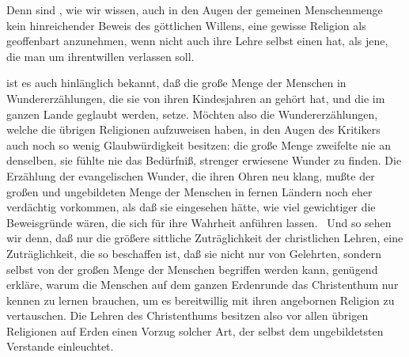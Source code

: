 \begin{aufza}
Denn  sind , wie wir wissen, auch in den Augen der gemeinen Menschenmenge kein hinreichender Beweis des göttlichen Willens, eine gewisse Religion als geoffenbart anzunehmen, wenn nicht auch ihre Lehre selbst einen  hat, als jene, die man um ihrentwillen verlassen soll.\par
{} ist es auch hinlänglich bekannt, daß die große Menge der Menschen in Wundererzählungen, die sie von ihren Kindesjahren an gehört hat, und die im ganzen Lande geglaubt werden,  setze. Möchten also die Wundererzählungen, welche die übrigen Religionen aufzuweisen haben, in den Augen des Kritikers auch noch so wenig Glaubwürdigkeit besitzen: die große Menge zweifelte nie an denselben, sie fühlte nie das Bedürfniß, strenger erwiesene Wunder zu finden. Die Erzählung der evangelischen Wunder, die ihren Ohren neu klang, mußte der großen und ungebildeten Menge der Menschen in fernen Ländern noch eher verdächtig vorkommen, als daß sie eingesehen hätte, wie viel gewichtiger die Beweisgründe wären, die sich für ihre Wahrheit anführen lassen.~ Und so sehen wir denn, daß nur die größere sittliche Zuträglichkeit der christlichen Lehren, eine Zuträglichkeit, die so beschaffen ist, daß sie nicht nur von Gelehrten, sondern selbst von der großen Menge der Menschen begriffen werden kann, genügend erkläre, warum die Menschen auf dem ganzen Erdenrunde das Christenthum nur kennen zu lernen brauchen, um es bereitwillig mit ihren angebornen Religion zu vertauschen. Die Lehren des Christenthums besitzen also vor allen übrigen Religionen auf Erden einen Vorzug solcher Art, der selbst dem ungebildetsten Verstande einleuchtet.
\end{aufza}


\begin{center}\end{center}

